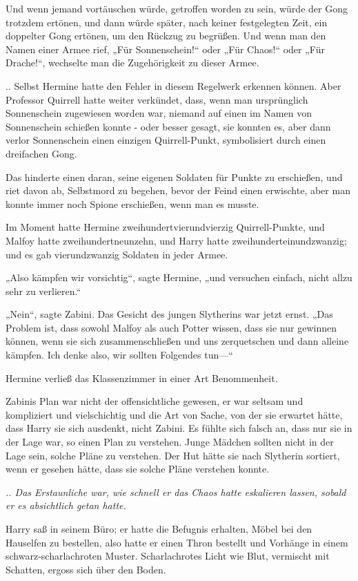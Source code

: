 {Und wenn jemand vortäuschen würde, getroffen worden zu sein, würde der Gong trotzdem ertönen, und dann würde später, nach keiner festgelegten Zeit, ein doppelter Gong ertönen, um den Rückzug zu begrüßen. Und wenn man den Namen einer Armee rief, „Für Sonnenschein!“ oder „Für Chaos!“ oder „Für Drache!“, wechselte man die Zugehörigkeit zu dieser Armee.

.. Selbst Hermine hatte den Fehler in diesem Regelwerk erkennen können. Aber Professor Quirrell hatte weiter verkündet, dass, wenn man ursprünglich Sonnenschein zugewiesen worden war, niemand auf einen im Namen von Sonnenschein schießen konnte - oder besser gesagt, sie konnten es, aber dann verlor Sonnenschein einen einzigen Quirrell-Punkt, symbolisiert durch einen dreifachen Gong.

Das hinderte einen daran, seine eigenen Soldaten für Punkte zu erschießen, und riet davon ab, Selbstmord zu begehen, bevor der Feind einen erwischte, aber man konnte immer noch Spione erschießen, wenn man es musste.

Im Moment hatte Hermine zweihundertvierundvierzig Quirrell-Punkte, und Malfoy hatte zweihundertneunzehn, und Harry hatte zweihunderteinundzwanzig; und es gab vierundzwanzig Soldaten in jeder Armee.

„Also kämpfen wir vorsichtig“, sagte Hermine, „und versuchen einfach, nicht allzu sehr zu verlieren.“

„Nein“, sagte Zabini. Das Gesicht des jungen Slytherins war jetzt ernst. „Das Problem ist, dass sowohl Malfoy als auch Potter wissen, dass sie nur gewinnen können, wenn sie sich zusammenschließen und uns zerquetschen und dann alleine kämpfen. Ich denke also, wir sollten Folgendes tun—“

Hermine verließ das Klassenzimmer in einer Art Benommenheit.

Zabinis Plan war nicht der offensichtliche gewesen, er war seltsam und kompliziert und vielschichtig und die Art von Sache, von der sie erwartet hätte, dass Harry sie sich ausdenkt, nicht Zabini. Es fühlte sich falsch an, dass nur sie in der Lage war, so einen Plan zu verstehen. Junge Mädchen sollten nicht in der Lage sein, solche Pläne zu verstehen. Der Hut hätte sie nach Slytherin sortiert, wenn er gesehen hätte, dass sie solche Pläne verstehen konnte.

\emph{.. Das Erstaunliche war, wie schnell er das Chaos hatte eskalieren lassen, sobald er es absichtlich getan hatte.}

Harry saß in seinem Büro; er hatte die Befugnis erhalten, Möbel bei den Hauselfen zu bestellen, also hatte er einen Thron bestellt und Vorhänge in einem schwarz-scharlachroten Muster. Scharlachrotes Licht wie Blut, vermischt mit Schatten, ergoss sich über den Boden.

}
